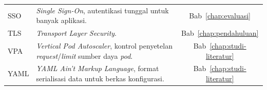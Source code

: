 \begin{longtable}{@{} l >{\raggedright\arraybackslash}p{8cm} c @{}}
SSO & \textit{Single Sign-On}, autentikasi tunggal untuk banyak aplikasi. & Bab~\ref{chap:evaluasi} \\
TLS & \textit{Transport Layer Security}. & Bab~\ref{chap:pendahuluan} \\
VPA & \textit{Vertical Pod Autoscaler}, kontrol penyetelan \textit{request}/\textit{limit} sumber daya \textit{pod}. & Bab~\ref{chap:studi-literatur} \\
YAML & \textit{YAML Ain't Markup Language}, format serialisasi data untuk berkas konfigurasi. & Bab~\ref{chap:studi-literatur} \\

\end{longtable}
